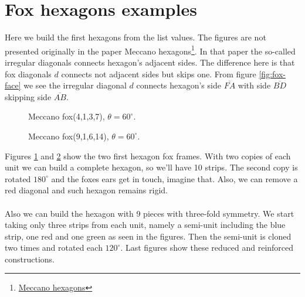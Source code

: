 \documentclass[11pt]{article}
\begin{document}
\section{Fox hexagons examples}

Here we build the first hexagons from the list values. The figures are not presented originally in the paper
Meccano hexagons\footnote{
\href{https://github.com/heptagons/meccano/tree/main/hexa/hexagons.pdf}{Meccano hexagons}	
}. In that paper the so-called irregular diagonals connects hexagon's adjacent sides. 
The difference here is that fox diagonals $d$ connects not adjacent sides but skips one. 
From figure \ref{fig:fox-face} we see the irregular diagonal $d$ connects hexagon's side $\overline{FA}$
with side $\overline{BD}$ skipping side $\overline{AB}$.

\setlength{\columnsep}{10pt}
\begin{multicols}{1}
\begin{figure}[H]
\centering
{}
\caption{Meccano fox(4,1,3,7), $\theta=60^\circ$.}
\label{fig:4-1-3-7}
\end{figure}

\begin{figure}[H]
\centering
{}
\caption{Meccano fox(9,1,6,14), $\theta=60^\circ$.}
\label{fig:9-1-6-14}
\end{figure}
\end{multicols}

Figures \ref{fig:4-1-3-7} and \ref{fig:9-1-6-14} show the two first hexagon fox frames. With 
two copies of each unit we can build a complete hexagon, so we'll have 10 strips. The second copy
is rotated $180^\circ$ and the foxes ears get in touch, imagine that. Also, we can remove a
red diagonal and such hexagon remains rigid.
\\\\
Also we can build the hexagon with 9 pieces with three-fold symmetry.
We start taking only three strips from each unit,
namely a semi-unit including the blue strip, one red and one green as seen in the figures.
Then the semi-unit is cloned two times and rotated each $120^\circ$.
Last figures show these reduced and reinforced constructions.
\end{document}
